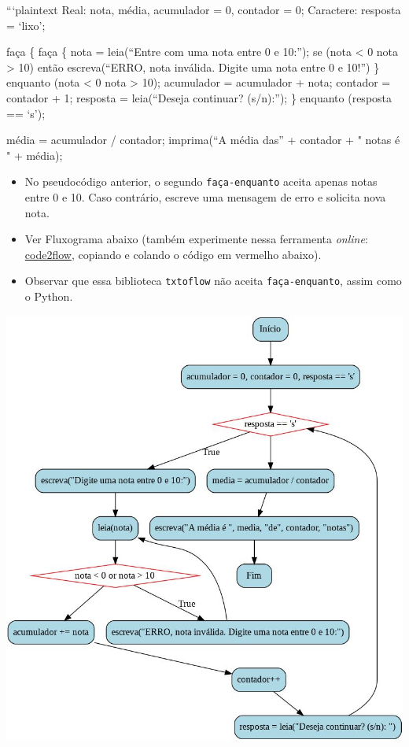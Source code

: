 \documentclass[12pt,a4paper]{article}
\providecommand{\tightlist}{%
      \setlength{\itemsep}{0pt}\setlength{\parskip}{0pt}}
\begin{document}
```plaintext Real: nota, média, acumulador = 0, contador = 0; Caractere:
resposta = `lixo';

faça \{ faça \{ nota = leia(``Entre com uma nota entre 0 e 10:''); se
(nota \textless{} 0 \textbar{}\textbar{} nota \textgreater{} 10) então
escreva(``ERRO, nota inválida. Digite uma nota entre 0 e 10!'') \}
enquanto (nota \textless{} 0 \textbar{}\textbar{} nota \textgreater{}
10); acumulador = acumulador + nota; contador = contador + 1; resposta =
leia(``Deseja continuar? (s/n):''); \} enquanto (resposta == `s');

média = acumulador / contador; imprima(``A média das'' + contador + "
notas é " + média);

    \begin{itemize}
\tightlist
\item
  No pseudocódigo anterior, o segundo \texttt{faça-enquanto} aceita
  apenas notas entre 0 e 10. Caso contrário, escreve uma mensagem de
  erro e solicita nova nota.
\end{itemize}

    \begin{itemize}
\item
  Ver Fluxograma abaixo (também experimente nessa ferramenta
  \emph{online}: \href{https://app.code2flow.com/}{code2flow}, copiando
  e colando o código em vermelho abaixo).
\item
  Observar que essa biblioteca \texttt{txtoflow} não aceita
  \texttt{faça-enquanto}, assim como o Python.
\end{itemize}

\includegraphics{"figs/flowchartCap4b.png"}
\end{document}
